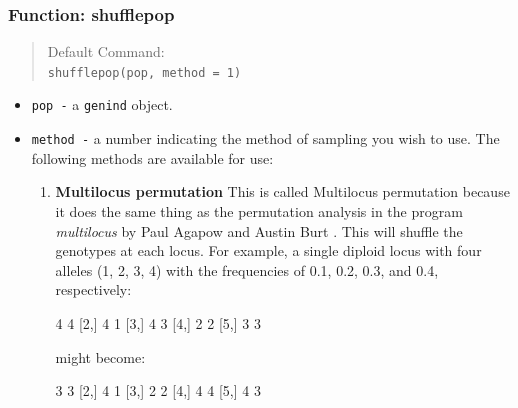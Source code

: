 \documentclass[letterpaper]{article}
\begin{document}
\subsubsection{Function: shufflepop}\label{data.manip:shuffle:shufflepop}
\begin{quote}
Default Command:\\
\texttt{shufflepop(pop, method = 1)}
\end{quote}
\begin{itemize}
  \item \texttt{pop -} a \texttt{genind} object.
  \item \texttt{method -} a number indicating the method of sampling you wish to use. 
  The following methods are available for use:
  \begin{enumerate}
    \item \textbf{Multilocus permutation} This is called Multilocus permutation because it does the same thing as the permutation analysis in the program \textit{multilocus} by Paul Agapow and Austin Burt \cite{Agapow:2001}. This will shuffle the genotypes at each locus. For example, a single diploid locus with four alleles (1, 2, 3, 4) with the frequencies of 0.1, 0.2, 0.3, and 0.4, respectively:
\begin{Schunk}
\begin{Soutput}
     [,1] [,2]
[1,]    4    4
[2,]    4    1
[3,]    4    3
[4,]    2    2
[5,]    3    3
\end{Soutput}
\end{Schunk}
might become:
\begin{Schunk}
\begin{Soutput}
     [,1] [,2]
[1,]    3    3
[2,]    4    1
[3,]    2    2
[4,]    4    4
[5,]    4    3
\end{Soutput}
\end{Schunk}


\end{enumerate}
\end{itemize}
\end{document}
